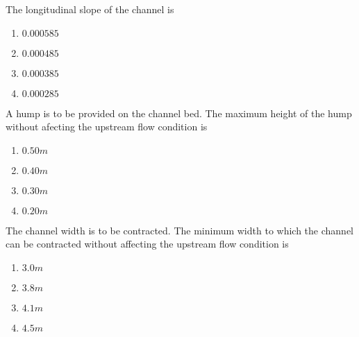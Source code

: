             \item \label{71} The longitudinal slope of the channel is
                \begin{enumerate}
                    \item $0.000585$
                    \item $0.000485$
                    \item $0.000385$
                    \item $0.000285$
                \end{enumerate}
            \item \label{72}  A hump is to be provided on the channel bed. The maximum height of the hump without afecting the upstream flow condition is
                \begin{enumerate}
                    \item $0.50m$
                    \item $0.40m$
                    \item $0.30m$
                    \item $0.20m$
                \end{enumerate}

            \item \label{73} The channel width is to be contracted. The minimum width to which the channel can be contracted without affecting the upstream flow condition is
                \begin{enumerate}
                    \item $3.0m$
                    \item $3.8m$
                    \item $4.1m$
                    \item $4.5m$
                \end{enumerate}

